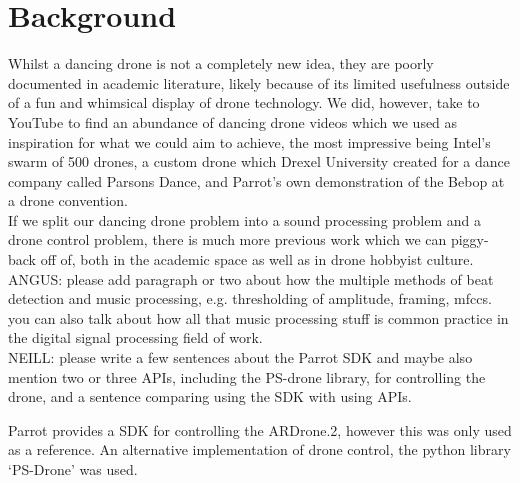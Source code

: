 \section{Background}

Whilst a dancing drone is not a completely new idea, they are poorly documented in academic literature, likely because of its limited usefulness outside of a fun and whimsical display of drone technology. We did, however, take to YouTube to find an abundance of dancing drone videos which we used as inspiration for what we could aim to achieve, the most impressive being Intel's swarm of 500 drones, a custom drone which Drexel University created for a dance company called Parsons Dance, and Parrot's own demonstration of the Bebop at a drone convention.\\


If we split our dancing drone problem into a sound processing problem and a drone control problem, there is much more previous work which we can piggy-back off of, both in the academic space as well as in drone hobbyist culture.\\

ANGUS: please add paragraph or two about how the multiple methods of beat detection and music processing, e.g. thresholding of amplitude, framing, mfccs. you can also talk about how all that music processing stuff is common practice in the digital signal processing field of work.\\

NEILL: please write a few sentences about the Parrot SDK and maybe also mention two or three APIs, including the PS-drone library, for controlling the drone, and a sentence comparing using the SDK with using APIs.

Parrot provides a SDK for controlling the ARDrone.2, however this was only used as a reference. An alternative
implementation of drone control, the python library `PS-Drone' was used.
